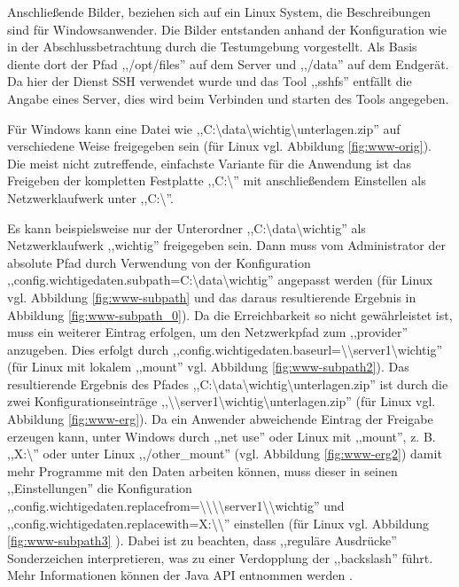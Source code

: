 \documentclass[oneside, ngerman, toc=bibliography,bibliography=totoc,listof=entryprefix, open=right,numbers=noenddot,fontsize=12pt]{scrbook}
\begin{document}
Anschließende Bilder, beziehen sich auf ein Linux System, die Beschreibungen sind für Windowsanwender.
Die Bilder entstanden anhand der Konfiguration wie in der Abschlussbetrachtung durch die Testumgebung vorgestellt. Als Basis diente dort der Pfad ,,/opt/files'' auf dem Server und ,,/data'' auf dem Endgerät.
Da hier der Dienst SSH verwendet wurde und das Tool ,,sshfs'' entfällt die Angabe eines Server, dies wird beim Verbinden und starten des Tools angegeben.


Für Windows kann eine Datei wie ,,C:\textbackslash{}data\textbackslash{}wichtig\textbackslash{}unterlagen.zip'' auf verschiedene Weise freigegeben sein (für Linux vgl. Abbildung \ref{fig:www-orig}).
Die meist nicht zutreffende, einfachste Variante für die Anwendung ist das Freigeben der kompletten Festplatte ,,C:\textbackslash{}'' mit anschließendem Einstellen als Netzwerklaufwerk unter ,,C:\textbackslash{}''.


Es kann beispielsweise nur der Unterordner ,,C:\textbackslash{}data\textbackslash{}wichtig'' als Netzwerklaufwerk ,,wichtig'' freigegeben sein. Dann muss vom Administrator der absolute Pfad durch Verwendung von der Konfiguration ,,config.wichtigedaten.subpath=C:\textbackslash{}data\textbackslash{}wichtig'' angepasst werden (für Linux vgl. Abbildung \ref{fig:www-subpath} und das daraus resultierende Ergebnis in Abbildung \ref{fig:www-subpath_0}). Da die Erreichbarkeit so nicht gewährleistet ist, muss ein weiterer Eintrag erfolgen, um den Netzwerkpfad zum ,,provider'' anzugeben. Dies erfolgt durch ,,config.wichtigedaten.baseurl=\textbackslash{}\textbackslash{}server1\textbackslash{}wichtig'' (für Linux mit lokalem ,,mount'' vgl. Abbildung  \ref{fig:www-subpath2}). Das resultierende Ergebnis des Pfades ,,C:\textbackslash{}data\textbackslash{}wichtig\textbackslash{}unterlagen.zip'' ist durch die zwei Konfigurationseinträge  ,,\textbackslash{}\textbackslash{}server1\textbackslash{}wichtig\textbackslash{}unterlagen.zip'' (für Linux vgl. Abbildung \ref{fig:www-erg}). Da ein Anwender abweichende Eintrag der Freigabe erzeugen kann, unter Windows durch ,,net use'' oder Linux mit ,,mount'', z. B. ,,X:\textbackslash{}'' oder unter Linux ,,/other\_mount'' (vgl. Abbildung \ref{fig:www-erg2})  damit mehr Programme mit den Daten arbeiten können, muss dieser in seinen ,,Einstellungen'' die Konfiguration ,,config.wichtigedaten.replacefrom=\textbackslash{}\textbackslash{}\textbackslash{}\textbackslash{}server1\textbackslash{}\textbackslash{}wichtig'' und ,,config.wichtigedaten.replacewith=X:\textbackslash{}\textbackslash{}'' einstellen  (für Linux vgl. Abbildung \ref{fig:www-subpath3} ). Dabei ist zu beachten, dass ,,reguläre Ausdrücke'' Sonderzeichen interpretieren, was zu einer Verdopplung der ,,backslash'' führt. Mehr Informationen können der Java API entnommen werden  \cite{javaregex}.
\end{document}
